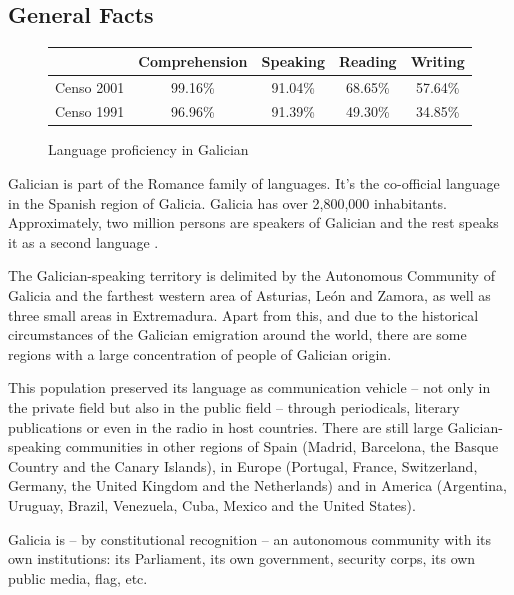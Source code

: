 \clearpage


\begin{multicols}{2}

\subsection{General Facts}

\begin{figure}[htb]
\center
\begin{tabular}{|c|c|c|c|c|}
\hline  & Comprehension & Speaking & Reading & Writing \\ 
\hline Censo 2001 & 99.16\% & 91.04\% & 68.65\% & 57.64\% \\ 
\hline Censo 1991 & 96.96\% & 91.39\% & 49.30\% & 34.85\% \\ 
\hline 
\end{tabular}
\caption{Language proficiency in Galician \cite{GAL-Nota8}}
\end{figure}

Galician is part of the Romance family of languages. It’s the co-official language in the Spanish region of Galicia. Galicia has over 2,800,000 inhabitants. Approximately, two million persons are speakers of Galician and the rest speaks it as a second language \cite{GAL-Nota5,GAL-Nota6}.

The Galician-speaking territory is delimited by the Autonomous Community of Galicia and the farthest western area of Asturias, León and Zamora, as well as three small areas in Extremadura. Apart from this, and due to the historical circumstances of the Galician emigration around the world, there are some regions with a large concentration of people of Galician origin. 

This population preserved its language as communication vehicle -- not only in the private field but also in the public field -- through periodicals, literary publications or even in the radio in host countries. There are still large Galician-speaking communities in other regions of Spain (Madrid, Barcelona, the Basque Country and the Canary Islands), in Europe (Portugal, France, Switzerland, Germany, the United Kingdom and the Netherlands) and in America (Argentina, Uruguay, Brazil, Venezuela, Cuba, Mexico and the United States).

Galicia is -- by constitutional recognition -- an autonomous community with its own institutions: its Parliament, its own government, security corps, its own public media, flag, etc.


\end{multicols}
